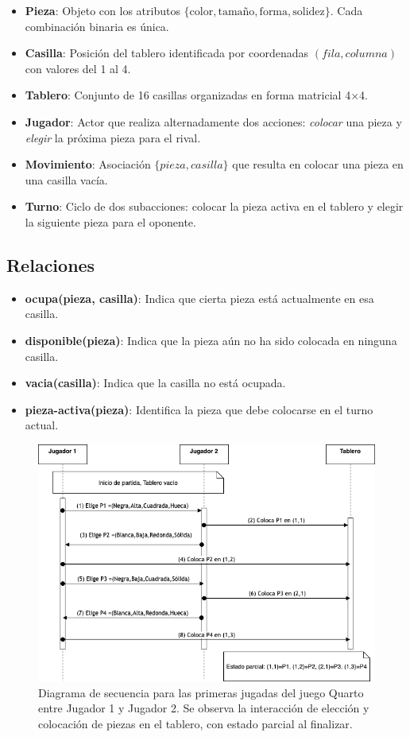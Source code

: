 \documentclass[conference]{IEEEtran}
\begin{document}
\begin{itemize}
\item \textbf{Pieza}: Objeto con los atributos $\{\text{color}, \text{tamaño}, \text{forma}, \text{solidez}\}$. Cada combinación binaria es única.
\item \textbf{Casilla}: Posición del tablero identificada por coordenadas $(fila, columna)$ con valores del 1 al 4.
\item \textbf{Tablero}: Conjunto de 16 casillas organizadas en forma matricial 4×4.
\item \textbf{Jugador}: Actor que realiza alternadamente dos acciones: \textit{colocar} una pieza y \textit{elegir} la próxima pieza para el rival.
\item \textbf{Movimiento}: Asociación $\{pieza, casilla\}$ que resulta en colocar una pieza en una casilla vacía.
\item \textbf{Turno}: Ciclo de dos subacciones: colocar la pieza activa en el tablero y elegir la siguiente pieza para el oponente.
\end{itemize}

\subsection{Relaciones}

\begin{itemize}
\item \textbf{ocupa(pieza, casilla)}: Indica que cierta pieza está actualmente en esa casilla.
\item \textbf{disponible(pieza)}: Indica que la pieza aún no ha sido colocada en ninguna casilla.
\item \textbf{vacia(casilla)}: Indica que la casilla no está ocupada.
\item \textbf{pieza-activa(pieza)}: Identifica la pieza que debe colocarse en el turno actual.
\end{itemize}


\begin{figure}[h!]
	\centering
	\includegraphics[width=0.95\linewidth]{img/diagrama-secuencia.png}
	\caption{Diagrama de secuencia para las primeras jugadas del juego Quarto entre Jugador 1 y Jugador 2. Se observa la interacción de elección y colocación de piezas en el tablero, con estado parcial al finalizar.}
	\label{fig:secuencia_quarto}
\end{figure}
\end{document}
